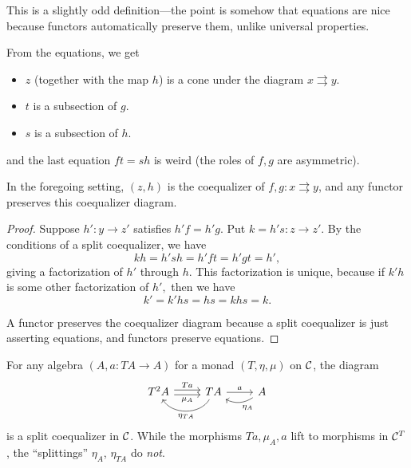 \documentclass[12pt]{article}
\begin{document}
This is a slightly odd definition---the point is somehow that equations are nice because functors automatically preserve them, unlike universal properties.

From the equations, we get
\begin{itemize}
    \item $z$ (together with the map $h$) is a cone under the diagram $x \rightrightarrows y$.
    \item $t$ is a subsection of $g$.
    \item $s$ is a subsection of $h$.
\end{itemize}
and the last equation $ft=sh$ is weird (the roles of $f,g$ are asymmetric).

\begin{lem}
    In the foregoing setting, $(z,h)$ is the coequalizer of $f,g:x\rightrightarrows y$, and any functor preserves this coequalizer diagram.
\end{lem}
\begin{proof}
    Suppose $h':y\to z'$ satisfies $h'f=h'g.$ Put $k=h's:z\to z'.$ By the conditions of a split coequalizer, we have $$kh=h'sh=h'ft=h'gt=h',$$ giving a factorization of $h'$ through $h.$ This factorization is unique, because if $k'h$ is some other factorization of $h',$ then we have $$k'=k'hs=hs=khs=k.$$
    
    A functor preserves the coequalizer diagram because a split coequalizer is just asserting equations, and functors preserve equations.
\end{proof}

\begin{eg}
    For any algebra $(A,a:TA\to A)$ for a monad $(T,\eta,\mu)$ on $\mathcal{C}$, the diagram
    \[\begin{tikzcd}
        T^2 A \rar[shift left=0.5ex, "Ta"] \rar[shift right=0.5ex, "\mu_A"'] & TA \rar["a"] \lar[bend left=60, "\eta_{TA}"] & A \lar[bend left, "\eta_A"]
    \end{tikzcd}\]
    is a split coequalizer in $\mathcal{C}$. While the morphisms $Ta,\mu_A, a$ lift to morphisms in $\mathcal{C}^T$, the ``splittings'' $\eta_A$, $\eta_{TA}$ do \textit{not}.
\end{eg}
\end{document}
